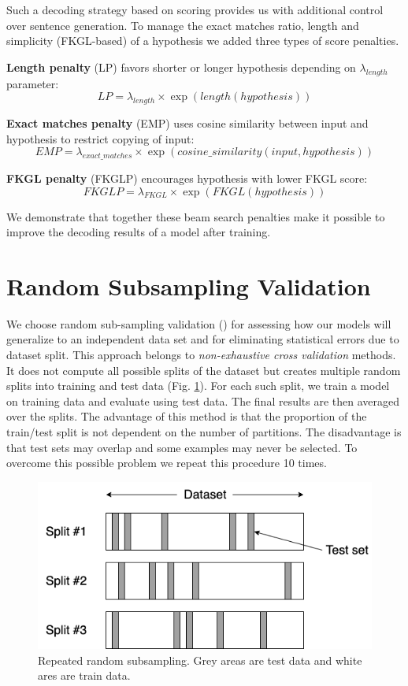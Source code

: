 Such a decoding strategy based on scoring provides us with additional control over sentence generation. To manage the exact matches ratio, length and simplicity (FKGL-based) of a hypothesis we added three types of score penalties. 

\textbf{Length penalty} (LP) favors shorter or longer hypothesis depending on $\lambda_{length}$ parameter:
\medskip
\[LP = \lambda_{length} \times \exp(length(hypothesis))\]
\medskip

\textbf{Exact matches penalty} (EMP) uses cosine similarity between input and hypothesis to restrict copying of input:
\medskip
\[EMP = \lambda_{exact\_matches} \times \exp(cosine\_similarity(input, hypothesis))\]
\medskip

\textbf{FKGL penalty} (FKGLP) encourages hypothesis with lower FKGL score:
\medskip
\[FKGLP = \lambda_{FKGL} \times \exp(FKGL(hypothesis))\]
\medskip

We demonstrate that together these beam search penalties make it possible to improve the decoding results of a model after training.

\section{Random Subsampling Validation}

We choose random sub-sampling validation (\cite{Dubitzky}) for assessing how our models will generalize to an independent data set and for eliminating statistical errors due to dataset split. This approach belongs to \emph{non-exhaustive cross validation} methods. It does not compute all possible splits of the dataset but creates multiple random splits into training and test data (Fig. \ref{fig:subsampling}). For each such split, we train a model on training data and evaluate using test data. The final results are then averaged over the splits. The advantage of this method is that the proportion of the train/test split is not dependent on the number of partitions. The disadvantage is that test sets may overlap and some examples may never be selected. To overcome this possible problem we repeat this procedure 10 times.

\begin{figure}
    \centering
    \includegraphics[width=12cm]{Images/subsampling.png}
    \caption{Repeated random subsampling. Grey areas are test data and white ares are train data.}
    \label{fig:subsampling}
\end{figure}


